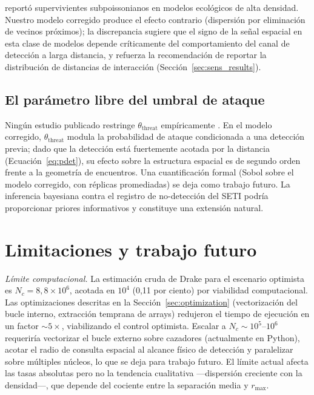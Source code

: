 \documentclass[useAMS,usenatbib,onecolumn]{mn2e}
\begin{document}
\citet{foucher2023} reportó supervivientes subpoissonianos en modelos
ecológicos de alta densidad.
Nuestro modelo corregido produce el efecto contrario (dispersión por
eliminación de vecinos próximos); la discrepancia sugiere que el signo
de la señal espacial en esta clase de modelos depende críticamente del
comportamiento del canal de detección a larga distancia, y refuerza la
recomendación de reportar la distribución de distancias de interacción
(Sección~\ref{sec:sens_results}).

\subsection{El parámetro libre del umbral de ataque}

Ningún estudio publicado restringe $\theta_\text{threat}$
empíricamente \citep{devladar2013}.
En el modelo corregido, $\theta_\text{threat}$ modula la probabilidad
de ataque condicionada a una detección previa; dado que la detección
está fuertemente acotada por la distancia (Ecuación~\ref{eq:pdet}),
su efecto sobre la estructura espacial es de segundo orden frente a la
geometría de encuentros.
Una cuantificación formal (Sobol sobre el modelo corregido, con
réplicas promediadas) se deja como trabajo futuro.
La inferencia bayesiana contra el registro de no-detección del SETI
podría proporcionar priores informativos y constituye una extensión
natural.

\section{Limitaciones y trabajo futuro}
\label{sec:limitations}

\textit{Límite computacional.}
La estimación cruda de Drake para el escenario optimista es
$N_c = 8{,}8\times10^6$, acotada en $10^4$ (0{,}11 por ciento) por
viabilidad computacional.
Las optimizaciones descritas en la Sección~\ref{sec:optimization}
(vectorización del bucle interno, extracción temprana de arrays)
redujeron el tiempo de ejecución en un factor $\sim 5\times$,
viabilizando el control optimista.
Escalar a $N_c \sim 10^5$--$10^6$ requeriría vectorizar el bucle
externo sobre cazadores (actualmente en Python), acotar el radio de
consulta espacial al alcance físico de detección y paralelizar sobre
múltiples núcleos, lo que se deja para trabajo futuro.
El límite actual afecta las tasas absolutas pero no la tendencia
cualitativa —dispersión creciente con la densidad—, que depende del
cociente entre la separación media y $r_\text{max}$.
\end{document}

